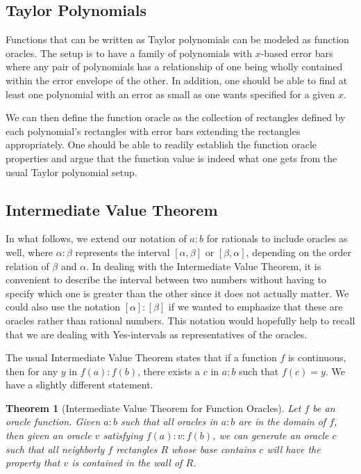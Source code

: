 \documentclass[12pt]{article}
\newtheorem{theorem}{Theorem}[subsection]
\begin{document}
\subsection{Taylor Polynomials}

Functions that can be written as Taylor polynomials can be modeled as function oracles. The setup is to have a family of polynomials with $x$-based error bars where any pair of polynomials has a relationship of one being wholly contained within the error envelope of the other. In addition, one should be able to find at least one polynomial with an error as small as one wants specified for a given $x$. 

We can then define the function oracle as the collection of rectangles defined by each polynomial's rectangles with error bars extending the rectangles appropriately. One should be able to readily establish the function oracle properties and argue that the function value is indeed what one gets from the usual Taylor polynomial setup. 



\subsection{Intermediate Value Theorem}

In what follows, we extend our notation of $a:b$ for rationals to include oracles as well, where $\alpha : \beta$ represents the interval $[\alpha,\beta]$ or $[\beta, \alpha]$, depending on the order relation of $\beta$ and $\alpha$. In dealing with the Intermediate Value Theorem, it is convenient to describe the interval between two numbers without having to specify which one is greater than the other since it does not actually matter. We could also use the notation $[\alpha]:[\beta]$ if we wanted to emphasize that these are oracles rather than rational numbers. This notation would hopefully help to recall that we are dealing with Yes-intervals as representatives of the oracles.

The usual Intermediate Value Theorem states that if a function $f$ is continuous, then for any $y$ in $f(a):f(b)$, there exists a $c$ in $a:b$ such that $f(c) = y$. We have a slightly different statement.

\begin{theorem}[Intermediate Value Theorem for Function Oracles]
Let $f$ be an oracle function. Given $a:b$ such that all oracles in $a:b$ are in the domain of $f$, then given an oracle $v$ satisfying $f(a):v:f(b)$, we can generate an oracle $c$ such that all neighborly $f$ rectangles $R$ whose base contains $c$ will have the property that $v$ is contained in the wall of $R$.
\end{theorem}
\end{document}
